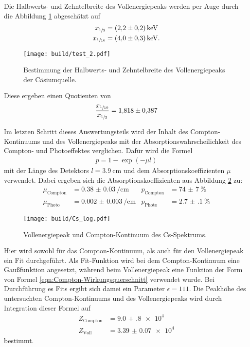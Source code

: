 Die Halbwerts- und Zehntelbreite des Vollenergiepeaks werden per Auge durch die Abbildung \ref{plt:halb}
abgeschätzt auf
\begin{align*}
  x_{\sfrac{1}{2}} &= \SI{2.2(2)}{\kilo\electronvolt} \\
  x_{\sfrac{1}{10}} &= \SI{4.0(3)}{\kilo\electronvolt}.
\end{align*}
\begin{figure}[htb]
  \centering
  \texttt{[image: build/test\_2.pdf]}
  \caption{Bestimmung der Halbwerts- und Zehntelbreite des Vollenergiepeaks der Cäsiumquelle.}
  \label{plt:halb}
\end{figure}
Diese ergeben einen Quotienten von
\begin{align*}
  \frac{x_{\sfrac{1}{10}}}{x_{\sfrac{1}{2}}} = \num{1.818(387)}
\end{align*}


Im letzten Schritt dieses Auswertungsteils wird der Inhalt des Compton-Kontinuums
und des Vollenergiepeaks mit der Absorptionswahrscheilichkeit des Compton- und
Photoeffektes verglichen. Dafür wird die Formel
\begin{align*}
	p = 1 - \exp\left(-\mu l\right)
\end{align*}
mit der Länge des Detektors $l = \SI{3.9}{\centi\meter}$ und dem
Absorptionskoeffizienten $\mu$ verwendet. Dabei ergeben sich die
Absorptionskoeffizienten aus Abbildung \ref{plt:Cs_abs} zu:
\begin{align*}
	\mu_\text{Compton} &= \SI{0.38(3)}{\per\centi\meter} & p_\text{Compton} &= \SI{74(7)}{\percent} \\
	\mu_\text{Photo} &= \SI{0.002(3)}{\per\centi\meter} & p_\text{Photo} &= \SI{2.7(1)}{\percent}
\end{align*}
\begin{figure}
    \texttt{[image: build/Cs\_log.pdf]}
  \caption{Vollenergiepeak und Compton-Kontinuum des Cs-Spektrums.}
  \label{plt:Cs_abs}
\end{figure}
Hier wird sowohl für das Compton-Kontinuum, als auch für den Vollenergiepeak ein
Fit durchgeführt. Als Fit-Funktion wird bei dem Compton-Kontinuum eine
Gaußfunktion angesetzt, während beim Vollenergiepeak eine Funktion der Form von
Formel \eqref{eqn:Compton-Wirkungsquerschnitt} verwendet wurde. Bei Durchführung
es Fits ergibt sich damei ein Parameter $\epsilon = \num{111}$. Die Peakhöhe des
untersuchten Compton-Kontinuums und des Vollenergiepeaks wird durch
Integration dieser Formel auf
\begin{align*}
  Z_\text{Compton} &= \num{9.0(8)e4} \\
  Z_\text{Voll} &= \num{3.39(7)e4}
\end{align*}
bestimmt.


